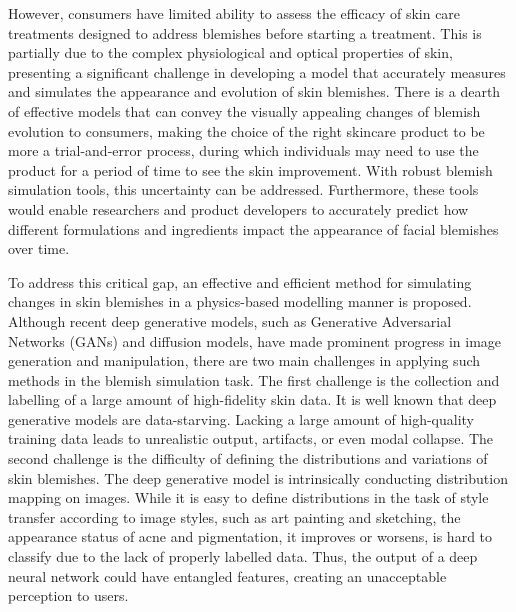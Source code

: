 \begin{spacing}{1.5}
However, consumers have limited ability to assess the efficacy of skin care treatments designed to address blemishes before starting a treatment\cite{doi:10.2352/EI.2023.35.7.IMAGE-276}. This is partially due to the complex physiological and optical properties of skin, presenting a significant challenge in developing a model that accurately measures and simulates the appearance and evolution of skin blemishes. There is a dearth of effective models that can convey the visually appealing changes of blemish evolution to consumers, making the choice of the right skincare product to be more a trial-and-error process, during which individuals may need to use the product for a period of time to see the skin improvement. With robust blemish simulation tools, this uncertainty can be addressed. Furthermore, these tools would enable researchers and product developers to accurately predict how different formulations and ingredients impact the appearance of facial blemishes over time.

To address this critical gap, an effective and efficient method for simulating changes in skin blemishes in a physics-based modelling manner is proposed. Although recent deep generative models, such as Generative Adversarial Networks\cite{goodfellowGenerativeAdversarialNetworks2014} (GANs) and diffusion models\cite{DBLP:conf/nips/HoJA20,rombach2021highresolution}, have made prominent progress in image generation and manipulation, there are two main challenges in applying such methods in the blemish simulation task. The first challenge is the collection and labelling of a large amount of high-fidelity skin data. It is well known that deep generative models are data-starving. Lacking a large amount of high-quality training data leads to unrealistic output, artifacts, or even modal collapse. The second challenge is the difficulty of defining the distributions and variations of skin blemishes. The deep generative model is intrinsically conducting distribution mapping on images. While it is easy to define distributions in the task of style transfer\cite{DBLP:conf/iclr/DumoulinSK17,DBLP:conf/iccv/ZhuPIE17, DBLP:journals/corr/GatysEB15a} according to image styles, such as art painting and sketching, the appearance status of acne and pigmentation, it improves or worsens, is hard to classify due to the lack of properly labelled data. Thus, the output of a deep neural network could have entangled features, creating an unacceptable perception to users.



\end{spacing}
